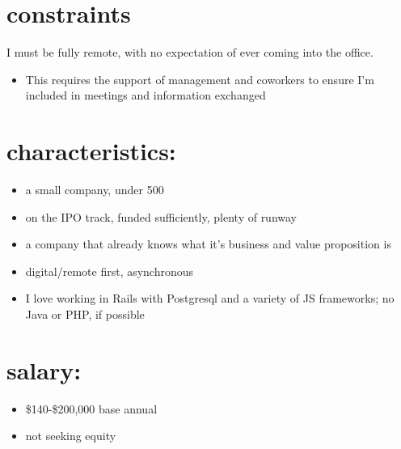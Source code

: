 \documentclass[14pt,letterpaper,sans]{moderncv} %
\begin{document}
\hypertarget{constraints}{%
\section{constraints}\label{constraints}}

I must be fully remote, with no expectation of ever coming into the office.

\begin{itemize}
\item
  This requires the support of management and coworkers to ensure I'm included in meetings and information exchanged
\end{itemize}

\hypertarget{characteristics}{%
\section{characteristics:}\label{characteristics}}

\begin{itemize}
\item  a small company, under 500
\item  on the IPO track, funded sufficiently, plenty of runway
\item  a company that already knows what it's business and value proposition is
\item  digital/remote first, asynchronous
\item  I love working in Rails with Postgresql and a variety of JS frameworks; no Java or PHP, if possible
\end{itemize}

\hypertarget{salary}{%
\section{salary:}\label{salary}}

\begin{itemize}
\item
  \$140-\$200,000 base annual
\item
  not seeking equity
\end{itemize}


\newpage

\end{document}
